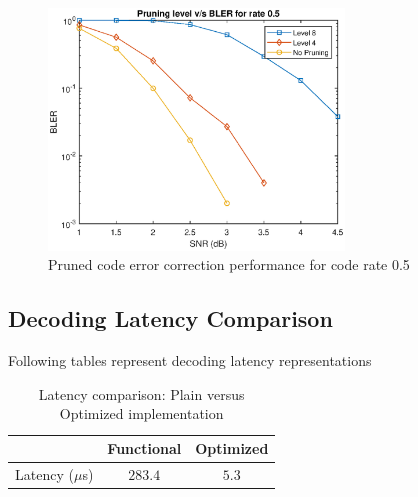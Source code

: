 \begin{figure}[]
	\centering
	\includegraphics[width=0.7\textwidth]{./figures/matlabPlots/rate5Curves.eps}
	\caption{Pruned code error correction performance for code rate 0.5}
	\label{fig:pruningLevelVsRate5}
\end{figure}
%

\subsection{Decoding Latency Comparison}
Following tables represent decoding latency representations
\begin{table}[!h]
	\begin{center}
		\caption{Latency comparison: Plain versus Optimized implementation}
		\label{tab:decoderLatency}
		\begin{tabular}{c|c|c} %
			\textbf{ } & Functional & Optimized \\
			\hline
			Latency ($\mu$s) & $283.4$ & $5.3$\\
		\end{tabular}
	\end{center}
\end{table}

